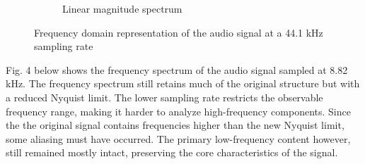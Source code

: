 \documentclass[12pt]{article}
\begin{document}
\begin{figure}[htbp]
\begin{subfigure}[b]{0.48\textwidth}
    \caption{Linear magnitude spectrum}
    \label{fig:f1}
  \end{subfigure}
  \caption{Frequency domain representation of the audio signal at a 44.1 kHz sampling rate}
\end{figure}
\FloatBarrier

Fig. 4 below shows the frequency spectrum of the audio signal sampled at 8.82 kHz. The frequency spectrum still retains much of the original structure but with a reduced Nyquist limit. The lower sampling rate restricts the observable frequency range, making it harder to analyze high-frequency components. Since the the original signal contains frequencies higher than the new Nyquist limit, some aliasing must have occurred. The primary low-frequency content however, still remained mostly intact, preserving the core characteristics of the signal.
\FloatBarrier
\end{document}
